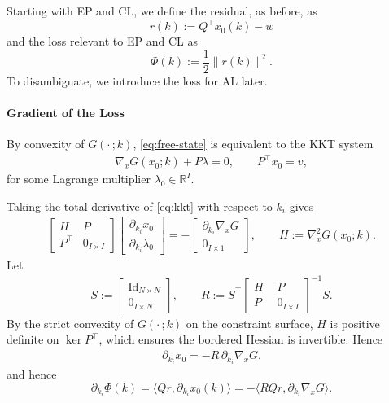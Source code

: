 \documentclass{siamart}
\begin{document}
Starting with EP and CL, we define the residual, as before, as 
\[ r(k) := Q^\top x_0(k) - w\] 
and the loss relevant to EP and  CL as 
\[
    \Phi(k) := \frac{1}{2}\|r(k)\|^{2}.
\]
To disambiguate, we introduce the loss for AL later.

\paragraph{Gradient of the Loss}
By convexity of $G(\cdot \,;k)$, \eqref{eq:free-state} is equivalent to the KKT system
\begin{align}
\nabla_x G(x_0; k) + P\lambda = 0,\qquad P^\top x_0 = v, \label{eq:kkt}
\end{align}
for some Lagrange multiplier $\lambda_0\in\mathbb{R}^I$.

Taking the total derivative of \eqref{eq:kkt} with respect to $k_i$ gives
\begin{align}
\begin{bmatrix}
H & P\\
P^\top & 0_{I \times I}
\end{bmatrix}
\begin{bmatrix}
\partial_{k_i}x_0\\[2pt]
\partial_{k_i}\lambda_0
\end{bmatrix}
= -
\begin{bmatrix}
\partial_{k_i}\nabla_x G\\
0_{I \times 1}
\end{bmatrix},\qquad
H := \nabla_x^2 G(x_0;k).\label{eq:lin-kkt}
\end{align}
Let
\begin{align}
S := \begin{bmatrix} \mathrm{Id}_{N\times N}\\ 0_{I\times N}\end{bmatrix},\qquad
R := S^\top
\begin{bmatrix}
H & P\\
P^\top & 0_{I \times I}
\end{bmatrix}^{-1}\!
S.\label{eq:R}
\end{align}
By the strict convexity of $G(\cdot\,;k)$ on the constraint surface, $H$ is positive definite on $\ker P^\top$, which ensures the bordered Hessian is invertible. Hence
\begin{align}
\partial_{k_i}x_0 = - R\,\partial_{k_i}\nabla_x G.\label{eq:phi-sens}
\end{align}
and hence
\begin{equation}\partial_{k_i} \Phi(k) = \langle Qr,  \partial_{k_i}x_0(k)\rangle =-\langle RQr,  \partial_{k_i}\nabla_x G\rangle . 
\label{eq:dynamics-grad}
\end{equation}
\end{document}
